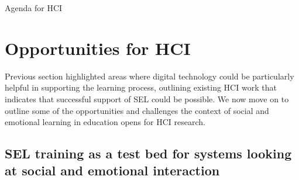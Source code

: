 \documentclass[prodmode,acmtochi]{acmsmall}
\begin{document}




 Agenda for HCI 
\section{Opportunities for HCI}
Previous section highlighted areas where digital technology could be particularly helpful in supporting the learning process, outlining existing HCI work that indicates that successful support of SEL could be possible. 
%
We now move on to outline some of the opportunities and challenges the context of social and emotional learning in education opens for HCI research. 

\subsection{SEL training as a test bed for systems looking at social and emotional interaction}
\end{document}
